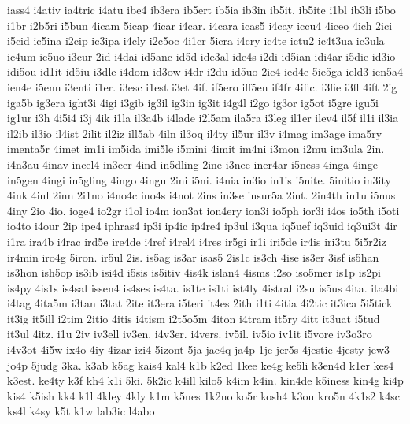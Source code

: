 {iass4 
i4ativ 
ia4tric 
i4atu 
ibe4 
ib3era 
ib5ert 
ib5ia 
ib3in 
ib5it. 
ib5ite 
i1bl 
ib3li 
i5bo 
i1br 
i2b5ri 
i5bun 
4icam 
5icap 
4icar 
i4car. 
i4cara 
icas5 
i4cay 
iccu4 
4iceo 
4ich 
2ici 
i5cid 
ic5ina 
i2cip 
ic3ipa 
i4cly 
i2c5oc 
4i1cr 
5icra 
i4cry 
ic4te 
ictu2 
ic4t3ua 
ic3ula 
ic4um 
ic5uo 
i3cur 
2id 
i4dai 
id5anc 
id5d 
ide3al 
ide4s 
i2di 
id5ian 
idi4ar 
i5die 
id3io 
idi5ou 
id1it 
id5iu 
i3dle 
i4dom 
id3ow 
i4dr 
i2du 
id5uo 
2ie4 
ied4e 
5ie5ga 
ield3 
ien5a4 
ien4e 
i5enn 
i3enti 
i1er. 
i3esc 
i1est 
i3et 
4if. 
if5ero 
iff5en 
if4fr 
4ific. 
i3fie 
i3fl 
4ift 
2ig 
iga5b 
ig3era 
ight3i 
4igi 
i3gib 
ig3il 
ig3in 
ig3it 
i4g4l 
i2go 
ig3or 
ig5ot 
i5gre 
igu5i 
ig1ur 
i3h 
4i5i4 
i3j 
4ik 
i1la 
il3a4b 
i4lade 
i2l5am 
ila5ra 
i3leg 
il1er 
ilev4 
il5f 
il1i 
il3ia 
il2ib 
il3io 
il4ist 
2ilit 
il2iz 
ill5ab 
4iln 
il3oq 
il4ty 
il5ur 
il3v 
i4mag 
im3age 
ima5ry 
imenta5r 
4imet 
im1i 
im5ida 
imi5le 
i5mini 
4imit 
im4ni 
i3mon 
i2mu 
im3ula 
2in. 
i4n3au 
4inav 
incel4 
in3cer 
4ind 
in5dling 
2ine 
i3nee 
iner4ar 
i5ness 
4inga 
4inge 
in5gen 
4ingi 
in5gling 
4ingo 
4ingu 
2ini 
i5ni. 
i4nia 
in3io 
in1is 
i5nite. 
5initio 
in3ity 
4ink 
4inl 
2inn 
2i1no 
i4no4c 
ino4s 
i4not 
2ins 
in3se 
insur5a 
2int. 
2in4th 
in1u 
i5nus 
4iny 
2io 
4io. 
ioge4 
io2gr 
i1ol 
io4m 
ion3at 
ion4ery 
ion3i 
io5ph 
ior3i 
i4os 
io5th 
i5oti 
io4to 
i4our 
2ip 
ipe4 
iphras4 
ip3i 
ip4ic 
ip4re4 
ip3ul 
i3qua 
iq5uef 
iq3uid 
iq3ui3t 
4ir 
i1ra 
ira4b 
i4rac 
ird5e 
ire4de 
i4ref 
i4rel4 
i4res 
ir5gi 
ir1i 
iri5de 
ir4is 
iri3tu 
5i5r2iz 
ir4min 
iro4g 
5iron. 
ir5ul 
2is. 
is5ag 
is3ar 
isas5 
2is1c 
is3ch 
4ise 
is3er 
3isf 
is5han 
is3hon 
ish5op 
is3ib 
isi4d 
i5sis 
is5itiv 
4is4k 
islan4 
4isms 
i2so 
iso5mer 
is1p 
is2pi 
is4py 
4is1s 
is4sal 
issen4 
is4ses 
is4ta. 
is1te 
is1ti 
ist4ly 
4istral 
i2su 
is5us 
4ita. 
ita4bi 
i4tag 
4ita5m 
i3tan 
i3tat 
2ite 
it3era 
i5teri 
it4es 
2ith 
i1ti 
4itia 
4i2tic 
it3ica 
5i5tick 
it3ig 
it5ill 
i2tim 
2itio 
4itis 
i4tism 
i2t5o5m 
4iton 
i4tram 
it5ry 
4itt 
it3uat 
i5tud 
it3ul 
4itz. 
i1u 
2iv 
iv3ell 
iv3en. 
i4v3er. 
i4vers. 
iv5il. 
iv5io 
iv1it 
i5vore 
iv3o3ro 
i4v3ot 
4i5w 
ix4o 
4iy 
4izar 
izi4 
5izont 
5ja 
jac4q 
ja4p 
1je 
jer5s 
4jestie 
4jesty 
jew3 
jo4p 
5judg 
3ka. 
k3ab 
k5ag 
kais4 
kal4 
k1b 
k2ed 
1kee 
ke4g 
ke5li 
k3en4d 
k1er 
kes4 
k3est. 
ke4ty 
k3f 
kh4 
k1i 
5ki. 
5k2ic 
k4ill 
kilo5 
k4im 
k4in. 
kin4de 
k5iness 
kin4g 
ki4p 
kis4 
k5ish 
kk4 
k1l 
4kley 
4kly 
k1m 
k5nes 
1k2no 
ko5r 
kosh4 
k3ou 
kro5n 
4k1s2 
k4sc 
ks4l 
k4sy 
k5t 
k1w 
lab3ic 
l4abo 
}
